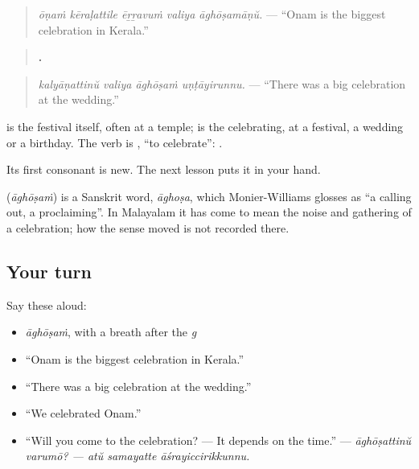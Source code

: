 \begin{quote}
\emph{ōṇaṁ kēraḷattile ēṟṟavuṁ valiya āghōṣamāṇŭ.} — \textquotedblleft{}Onam is the biggest celebration in Kerala.\textquotedblright{}
\end{quote}

\begin{quote}
\textbf{   .}
\end{quote}

\begin{quote}
\emph{kalyāṇattinŭ valiya āghōṣaṁ uṇṭāyirunnu.} — \textquotedblleft{}There was a big celebration at the wedding.\textquotedblright{}
\end{quote}

\textbf{} is the festival itself, often at a temple; \textbf{} is the celebrating, at a festival, a wedding or a birthday. The verb is \textbf{}, \textquotedblleft{}to celebrate\textquotedblright{}: \textbf{  }.

Its first consonant is new. The next lesson puts it in your hand.

\begin{cousinweb}
\textbf{} (\emph{āghōṣaṁ}) is a Sanskrit word, \emph{āghoṣa}, which Monier-Williams glosses as \textquotedblleft{}a calling out, a proclaiming\textquotedblright{}. In Malayalam it has come to mean the noise and gathering of a celebration; how the sense moved is not recorded there.
\end{cousinweb}

\subsection*{Your turn}
Say these aloud:

\begin{itemize}
\raggedright
  \item \emph{āghōṣaṁ}, with a breath after the \emph{g}
  \item \textquotedblleft{}Onam is the biggest celebration in Kerala.\textquotedblright{}
  \item \textquotedblleft{}There was a big celebration at the wedding.\textquotedblright{}
  \item \textquotedblleft{}We celebrated Onam.\textquotedblright{}
  \item \textquotedblleft{}Will you come to the celebration? — It depends on the time.\textquotedblright{} — \emph{āghōṣattinŭ varumō? — atŭ samayatte āśrayiccirikkunnu.}
\end{itemize}

